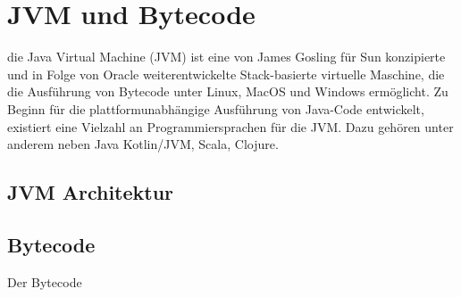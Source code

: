 \chapter{JVM und Bytecode}
\label{cha:jvm}

die Java Virtual Machine (JVM) ist eine von James Gosling für Sun konzipierte und in Folge von Oracle weiterentwickelte Stack-basierte virtuelle Maschine, die die Ausführung von Bytecode unter Linux, MacOS und Windows ermöglicht. Zu Beginn für die plattformunabhängige Ausführung von Java-Code entwickelt, existiert eine Vielzahl an Programmiersprachen für die JVM. Dazu gehören unter anderem neben Java Kotlin/JVM, Scala, Clojure.

\section{JVM Architektur}

\section{Bytecode}

Der Bytecode 